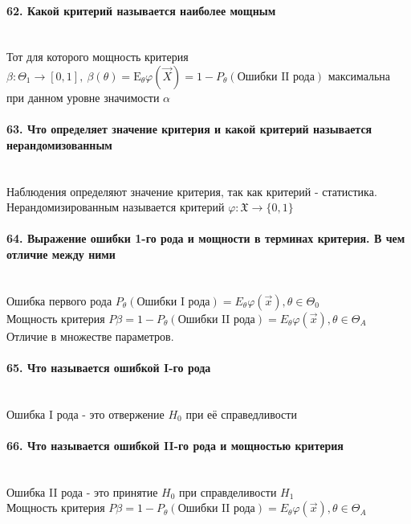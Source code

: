\documentclass[titlepage]{article}
\newcommand{\sX}{\mathfrak{X}}
\newcommand{\sE}{\mathrm{E}}
\begin{document}
\paragraph{62. Какой критерий называется наиболее мощным} ~\\
Тот для которого мощность критерия $\beta:\Theta_1\rightarrow[0,1],\ \beta(\theta) = \sE_\theta\varphi(\vec X) = 1 - P_\theta(\text{Ошибки II рода})$ максимальна при данном уровне значимости $\alpha$

\paragraph{63. Что определяет значение критерия и какой критерий называется нерандомизованным} ~\\
Наблюдения определяют значение критерия, так как критерий - статистика.\\
Нерандомизированным называется критерий $\varphi: \sX \rightarrow\{0,1\}$

\paragraph{64. Выражение ошибки 1-го рода и мощности в терминах критерия. В чем отличие между ними} ~\\
Ошибка первого рода $P_\theta(\text{Ошибки I рода}) = E_\theta\varphi(\vec x), \theta \in \Theta_0$\\
Мощность критерия $P\beta = 1 - P_\theta(\text{Ошибки II рода}) = E_\theta\varphi(\vec x), \theta \in \Theta_A$\\
Отличие в множестве параметров.

\paragraph{65. Что называется ошибкой I-го рода} ~\\
Ошибка I рода - это отвержение $H_0$ при её справедливости

\paragraph{66. Что называется ошибкой II-го рода и мощностью критерия} ~\\
Ошибка II рода - это принятие $H_0$ при справделивости $H_1$\\
Мощность критерия $P\beta = 1 - P_\theta(\text{Ошибки II рода}) = E_\theta\varphi(\vec x), \theta \in \Theta_A$
\end{document}
